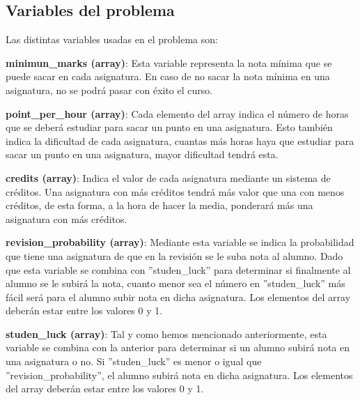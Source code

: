 \documentclass[11pt, a4paper, titlepage]{article}
\begin{document}
\subsection{Variables del problema}
Las distintas variables usadas en el problema son:

\vspace{5mm}

\textbf{minimun\_marks (array)}: Esta variable representa la nota mínima que se puede sacar en cada asignatura. En caso de no sacar la nota mínima en una asignatura, no se podrá pasar con éxito el curso.

\vspace{5mm}

\textbf{point\_per\_hour (array)}: Cada elemento del array indica el número de horas que se deberá estudiar para sacar un punto en una asignatura. Esto también indica la dificultad de cada asignatura, cuantas más horas haya que estudiar para sacar un punto en una asignatura, mayor dificultad tendrá esta.

\vspace{5mm}

\textbf{credits (array)}: Indica el valor de cada asignatura mediante un sistema de créditos. Una asignatura con más créditos tendrá más valor que una con menos créditos, de esta forma, a la hora de hacer la media, ponderará más una asignatura con más créditos.

\vspace{5mm}

\textbf{revision\_probability (array)}: Mediante esta variable se indica la probabilidad que tiene una asignatura de que en la revisión se le suba nota al alumno. Dado que esta variable se combina con ''studen\_luck'' para determinar si finalmente al alumno se le subirá la nota, cuanto menor sea el número en ''studen\_luck'' más fácil será para el alumno subir nota en dicha asignatura. Los elementos del array deberán estar entre los valores 0 y 1.

\vspace{5mm}

\textbf{studen\_luck (array)}: Tal y como hemos mencionado anteriormente, esta variable se combina con la anterior para determinar si un alumno subirá nota en una asignatura o no. Si ''studen\_luck'' es menor o igual que ''revision\_probability'', el alumno subirá nota en dicha asignatura. Los elementos del array deberán estar entre los valores 0 y 1.

\vspace{5mm}
\end{document}
